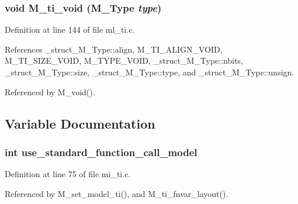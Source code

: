 \subsubsection{\setlength{\rightskip}{0pt plus 5cm}void M\_\-ti\_\-void (\bf{M\_\-Type} {\em type})}\label{ml__ti_8c_596f117999816a25475ec1acf46ef43f}




Definition at line 144 of file ml\_\-ti.c.

References \_\-struct\_\-M\_\-Type::align, M\_\-TI\_\-ALIGN\_\-VOID, M\_\-TI\_\-SIZE\_\-VOID, M\_\-TYPE\_\-VOID, \_\-struct\_\-M\_\-Type::nbits, \_\-struct\_\-M\_\-Type::size, \_\-struct\_\-M\_\-Type::type, and \_\-struct\_\-M\_\-Type::unsign.

Referenced by M\_\-void().

\subsection{Variable Documentation}
\subsubsection{\setlength{\rightskip}{0pt plus 5cm}int \bf{use\_\-standard\_\-function\_\-call\_\-model}}\label{ml__ti_8c_0c29a3c5541686d91b2debcd367b47e9}




Definition at line 75 of file mi\_\-ti.c.

Referenced by M\_\-set\_\-model\_\-ti(), and M\_\-ti\_\-fnvar\_\-layout().